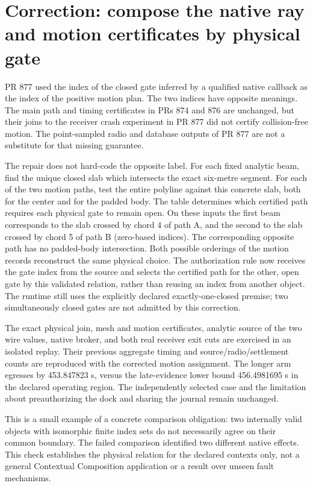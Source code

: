 \documentclass{article}
\begin{document}
\section*{Correction: compose the native ray and motion certificates by physical gate}

PR 877 used the index of the closed gate inferred by a qualified
native callback as the index of the positive motion plan. The two
indices have opposite meanings. The main path and timing certificates
in PRs 874 and 876 are unchanged, but their joins to the receiver
crash experiment in PR 877 did not certify collision-free motion.
The point-sampled radio and database outputs of PR 877 are not a
substitute for that missing guarantee.

The repair does not hard-code the opposite label. For each fixed
analytic beam, find the unique closed slab which intersects the exact
six-metre segment. For each of the two motion paths, test the entire
polyline against this concrete slab, both for the center and for
the padded body. The table determines which certified path requires
each physical gate to remain open. On these inputs the first beam
corresponds to the slab crossed by chord 4 of path A, and the second
to the slab crossed by chord 5 of path B (zero-based indices).
The corresponding opposite path has no padded-body intersection.
Both possible orderings of the motion records reconstruct the same
physical choice. The authorization rule now receives the gate index
from the source and selects the certified path for the other, open
gate by this validated relation, rather than reusing an index from
another object. The runtime still uses the explicitly declared
exactly-one-closed premise; two simultaneously closed gates are
not admitted by this correction.

The exact physical join, mesh and motion certificates, analytic
source of the two wire values, native broker, and both real receiver
exit cuts are exercised in an isolated replay. Their previous
aggregate timing and source/radio/settlement counts are reproduced
with the corrected motion assignment. The longer arm egresses
by 453.847823 s, versus the late-evidence lower bound 456.4981695 s
in the declared operating region. The independently selected case
and the limitation about preauthorizing the dock and sharing the
journal remain unchanged.

This is a small example of a concrete comparison obligation:
two internally valid objects with isomorphic finite index sets do
not necessarily agree on their common boundary. The failed
comparison identified two different native effects. This check
establishes the physical relation for the declared contexts only,
not a general Contextual Composition application or a result over
unseen fault mechanisms.
\end{document}
